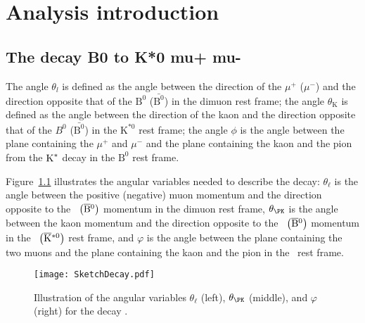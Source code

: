 \chapter{Analysis introduction}
\label{sec:theo}






\section{The decay B0 to K*0 mu+ mu-}
\label{sec:Kstmm}




The angle $\theta_l$ is defined as the angle between the direction of the $\mu^+ $ ($\mu^- $) and the direction opposite that of the $\text{B}^0$ ($\bar{\text{B}^0}$) in the dimuon rest frame; the angle $\theta_\mathrm{K} $ is defined as the angle between the direction of the kaon and the direction opposite that of the $B^0$ ($\bar{\text{B}^0}$) in the $\text{K}^{*0}$ rest frame; the angle $\phi$ is the angle between the plane containing the $\mu^+ $ and $\mu^- $ and the plane containing the kaon and the pion from the $\textrm{K}^\ast$ decay in the $\text{B}^0$ rest frame.

Figure~\ref{fig:ske} illustrates the angular variables needed to describe the decay: $\theta_\ell$
is the angle between the positive (negative) muon momentum and the direction opposite to the
\PBz\ $\big(\overline{\textrm{B}}{}^{0}\big)$ momentum in the dimuon rest frame,
$\theta_\PK$ is the angle between the kaon momentum and the direction opposite to
the \PBz\ $\big(\overline{\textrm{B}}{}^{0}\big)$ momentum in the \cPKstz\ $\big(\overline{\textrm{K}}{}^{\ast0}\big)$ rest frame,
and $\varphi$ is the angle between the plane containing the two muons and the plane containing the
kaon and the pion in the \PBz\ rest frame.

\begin{figure*}[t]
  \begin{center}
    \texttt{[image: SketchDecay.pdf]}
    \caption{Illustration of the angular variables $\theta_\ell$ (left), $\theta_\PK$ (middle), and $\varphi$ (right) for the decay \BtoKstmumudecay.}
    \label{fig:ske}
  \end{center}
\end{figure*}

